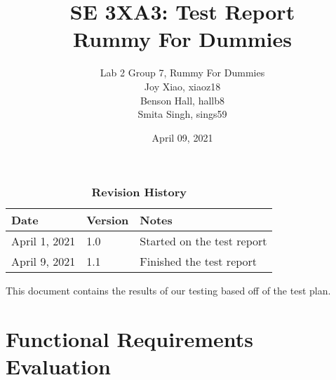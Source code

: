 \documentclass[12pt, titlepage]{article}
\title{SE 3XA3: Test Report\\Rummy For Dummies}
\author{Lab 2 Group 7, Rummy For Dummies
		\\ Joy Xiao, xiaoz18
		\\ Benson Hall, hallb8
		\\ Smita Singh, sings59
}
\date{April 09, 2021}
\begin{document}
\maketitle

\tableofcontents
\listoftables
\listoffigures

\begin{table}[bp]
\caption{\bf Revision History}
\begin{tabularx}{\textwidth}{p{3cm}p{2cm}X}
    \toprule {\bf Date} & {\bf Version} & {\bf Notes}\\
    \midrule
    April 1, 2021 & 1.0 & Started on the test report\\
    April 9, 2021 & 1.1 & Finished the test report\\
    \bottomrule
\end{tabularx}
\end{table}

\newpage 


This document contains the results of our testing based off of the test plan.

\section{Functional Requirements Evaluation}
\end{document}
